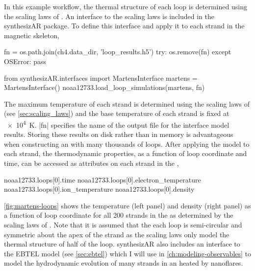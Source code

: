 In this example workflow, the thermal structure of each loop is determined using the scaling laws of \citet[see \autoref{sec:scaling_laws}]{martens_scaling_2010}. An interface to the \citeauthor{martens_scaling_2010} scaling laws is included in the synthesizAR package. To define this interface and apply it to each strand in the magnetic skeleton,
\begin{pycode}[chapter4]
fn = os.path.join(ch4.data_dir, 'loop_results.h5')
try:
    os.remove(fn)
except OSError:
    pass
\end{pycode}
\begin{pyblock}[chapter4][baselinestretch=1,xleftmargin=3em]
from synthesizAR.interfaces import MartensInterface
martens = MartensInterface()
noaa12733.load_loop_simulations(martens, fn)
\end{pyblock}
The maximum temperature of each strand is determined using the scaling laws of \citet{rosner_dynamics_1978} (see \autoref{sec:scaling_laws}) and the base temperature of each strand is fixed at \SI{e4}{\kelvin}. \pyv|fn| specifies the name of the output file for the interface model results. Storing these results on disk rather than in memory is advantageous when constructing an \AR{} with many thousands of loops. After applying the model to each strand, the thermodynamic properties, as a function of loop coordinate and time, can be accessed as attributes on each strand in the \AR{},
\begin{pyblock}[chapter4][baselinestretch=1,xleftmargin=3em]
noaa12733.loops[0].time
noaa12733.loops[0].electron_temperature
noaa12733.loops[0].ion_temperature
noaa12733.loops[0].density
\end{pyblock}
\autoref{fig:martens-loops} shows the temperature (left panel) and density (right panel) as a function of loop coordinate for all 200 strands in the \AR{} as determined by the scaling laws of \citet{martens_scaling_2010}. Note that it is assumed that the each loop is semi-circular and symmetric about the apex of the strand as the \citeauthor{martens_scaling_2010} scaling laws only model the thermal structure of half of the loop. synthesizAR also includes an interface to the EBTEL model (see \autoref{sec:ebtel}) which I will use in \autoref{ch:modeling-observables} to model the hydrodynamic evolution of many strands in an \AR{} heated by nanoflares.

